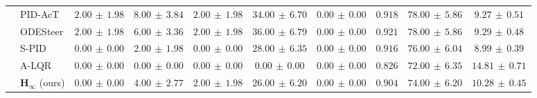 \begin{table}[!htbp]
{\begin{tabular}{llccccc|ccc}
 & PID-AcT & $2.00\,\pm\,1.98$ & $8.00\,\pm\,3.84$ & $2.00\,\pm\,1.98$ & $34.00\,\pm\,6.70$ & $0.00\,\pm\,0.00$ & $0.918$ & $78.00\,\pm\,5.86$ & $9.27\,\pm\,0.51$\\
 & ODESteer & $2.00\,\pm\,1.98$ & $6.00\,\pm\,3.36$ & $2.00\,\pm\,1.98$ & $36.00\,\pm\,6.79$ & $0.00\,\pm\,0.00$ & $0.921$ & $78.00\,\pm\,5.86$ & $9.29\,\pm\,0.48$\\
 & S-PID & $0.00\,\pm\,0.00$ & $2.00\,\pm\,1.98$ & $0.00\,\pm\,0.00$ & $28.00\,\pm\,6.35$ & $0.00\,\pm\,0.00$ & $0.916$ & $76.00\,\pm\,6.04$ & $8.99\,\pm\,0.39$\\
 & A-LQR & $0.00\,\pm\,0.00$ & $0.00\,\pm\,0.00$ & $0.00\,\pm\,0.00$ & $0.00\,\pm\,0.00$ & $0.00\,\pm\,0.00$ & $0.826$ & $72.00\,\pm\,6.35$ & $14.81\,\pm\,0.71$\\
 & $\boldsymbol{H_\infty}$ (ours) & $0.00\,\pm\,0.00$ & $4.00\,\pm\,2.77$ & $2.00\,\pm\,1.98$ & $26.00\,\pm\,6.20$ & $0.00\,\pm\,0.00$ & $0.904$ & $74.00\,\pm\,6.20$ & $10.28\,\pm\,0.45$\\
\bottomrule
\end{tabular}%
}
\end{table}
